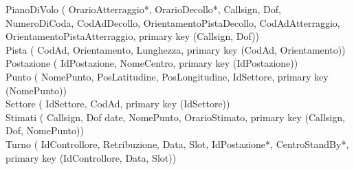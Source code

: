 PianoDiVolo (
     OrarioAtterraggio*,
     OrarioDecollo*,
     Callsign,
     Dof,
     NumeroDiCoda,
     CodAdDecollo,
     OrientamentoPistaDecollo,
     CodAdAtterraggio,
     OrientamentoPistaAtterraggio,
     primary key (Callsign, Dof))\\

Pista (
     CodAd,
     Orientamento,
     Lunghezza,
     primary key (CodAd, Orientamento))\\

Postazione (
     IdPostazione,
     NomeCentro,
     primary key (IdPostazione))\\

Punto (
     NomePunto,
     PosLatitudine,
     PosLongitudine,
     IdSettore,
     primary key (NomePunto))\\

Settore (
     IdSettore,
     CodAd,
     primary key (IdSettore))\\

Stimati (
     Callsign,
     Dof date,
     NomePunto,
     OrarioStimato,
     primary key (Callsign, Dof, NomePunto))\\

Turno (
     IdControllore,
     Retribuzione,
     Data,
     Slot,
     IdPostazione*,
     CentroStandBy*,
     primary key (IdControllore, Data, Slot))\\
